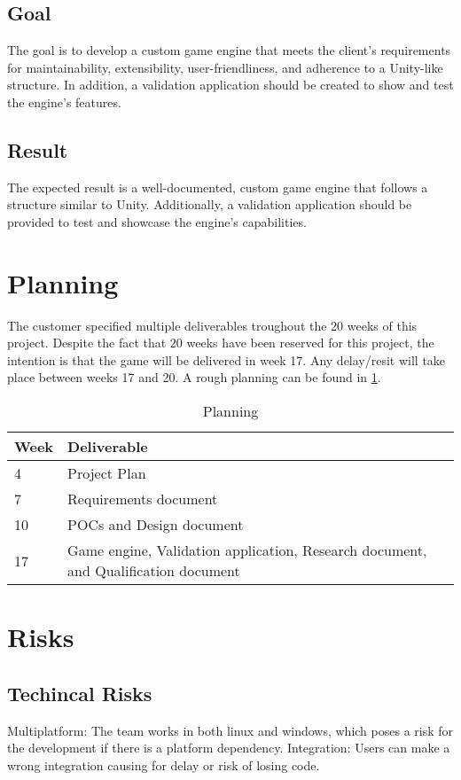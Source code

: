 \documentclass{projdoc}
\begin{document}
\subsection{Goal}
The goal is to develop a custom game engine that meets the client's requirements for maintainability, extensibility, user-friendliness, and adherence to a Unity-like structure. In addition, a validation application should be created to show and test the engine's features.

\subsection{Result}
The expected result is a well-documented, custom game engine that follows a structure similar to Unity. Additionally, a validation application should be provided to test and showcase the engine's capabilities.


\section{Planning}
The customer specified multiple deliverables troughout the 20 weeks of this project. Despite the fact that 20 weeks have been reserved for this project, the intention is that the game will be delivered in week 17. Any delay/resit will take place between weeks 17 and 20. A rough planning can be found in \cref{tab:planning}.
\begin{table}
	\begin{tabularx}{\linewidth}{lXr}
		\toprule
		Week & Deliverable & \\
		\midrule
		4 & Project Plan & \\
		7 & Requirements document & \\
		10 & POCs and Design document & \\
		17 & Game engine, Validation application, Research document, and Qualification document & \\
		\bottomrule
	\end{tabularx}
	\caption{Planning}
	\label{tab:planning}
\end{table}


\section{Risks}
\subsection{Techincal Risks}
Multiplatform: The team works in both linux and windows, which poses a risk for the development if there is a platform dependency.
Integration: Users can make a wrong integration causing for delay or risk of losing code.
\end{document}
